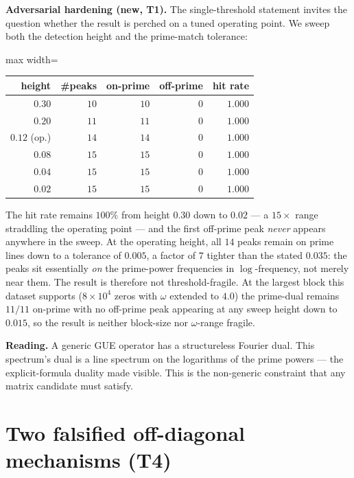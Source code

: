 \documentclass[11pt]{article}
\begin{document}
\textbf{Adversarial hardening (new, T1).} The single-threshold statement invites the question whether the result is perched on a tuned operating point. We sweep both the detection height and the prime-match tolerance:

\begin{center}
\begin{adjustbox}{max width=\linewidth}\begin{tabular}{rrrrr}
\toprule
height & \#peaks & on-prime & off-prime & hit rate \\
\midrule
$0.30$ & $10$ & $10$ & $0$ & $1.000$ \\
$0.20$ & $11$ & $11$ & $0$ & $1.000$ \\
$0.12$ (op.) & $14$ & $14$ & $0$ & $1.000$ \\
$0.08$ & $15$ & $15$ & $0$ & $1.000$ \\
$0.04$ & $15$ & $15$ & $0$ & $1.000$ \\
$0.02$ & $15$ & $15$ & $0$ & $1.000$ \\
\bottomrule
\end{tabular}\end{adjustbox}
\end{center}

\noindent The hit rate remains $100\%$ from height $0.30$ down to $0.02$ --- a $15\times$ range straddling the operating point --- and the first off-prime peak \emph{never} appears anywhere in the sweep. At the operating height, all $14$ peaks remain on prime lines down to a tolerance of $0.005$, a factor of $7$ tighter than the stated $0.035$: the peaks sit essentially \emph{on} the prime-power frequencies in $\log$-frequency, not merely near them. The result is therefore not threshold-fragile. At the largest block this dataset supports ($8\times10^4$ zeros with $\omega$ extended to $4.0$) the prime-dual remains $11/11$ on-prime with no off-prime peak appearing at any sweep height down to $0.015$, so the result is neither block-size nor $\omega$-range fragile.

\textbf{Reading.} A generic GUE operator has a structureless Fourier dual. This spectrum's dual is a line spectrum on the logarithms of the prime powers --- the explicit-formula duality made visible. This is the non-generic constraint that any matrix candidate must satisfy.

\section{Two falsified off-diagonal mechanisms (T4)}
\end{document}
